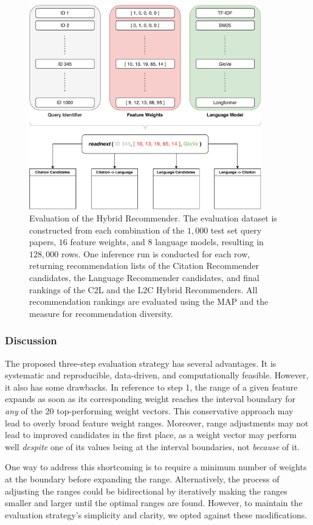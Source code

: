 \begin{figure}[htb!]
    \centering
    \includegraphics[width=0.9\textwidth]{diagrams/evaluation.pdf}
    \caption[Evaluation]{Evaluation of the Hybrid Recommender. The evaluation dataset is constructed from each combination of the $1,000$ test set query papers, $16$ feature weights, and $8$ language models, resulting in $128,000$ rows. One inference run is conducted for each row, returning recommendation lists of the Citation Recommender candidates, the Language Recommender candidates, and final rankings of the \ac{C2L} and the \ac{L2C} Hybrid Recommenders. All recommendation rankings are evaluated using the \ac{MAP} and the measure for recommendation diversity.
    }
    \label{fig:evaluation}
\end{figure}


\subsubsection*{Discussion}

The proposed three-step evaluation strategy has several advantages.
It is systematic and reproducible, data-driven, and computationally feasible.
However, it also has some drawbacks.
In reference to step 1, the range of a given feature expands as soon as its corresponding weight reaches the interval boundary for \emph{any} of the 20 top-performing weight vectors.
This conservative approach may lead to overly broad feature weight ranges.
Moreover, range adjustments may not lead to improved candidates in the first place, as a weight vector may perform well \emph{despite} one of its values being at the interval boundaries, not \emph{because} of it.

One way to address this shortcoming is to require a minimum number of weights at the boundary before expanding the range.
Alternatively, the process of adjusting the ranges could be bidirectional by iteratively making the ranges smaller and larger until the optimal ranges are found.
However, to maintain the evaluation strategy's simplicity and clarity, we opted against these modifications.
